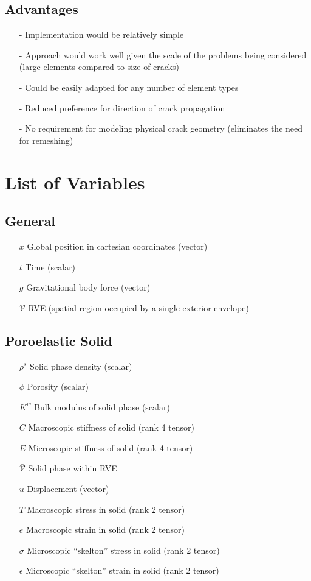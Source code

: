 \documentclass[11pt]{article} %
\begin{document}
\subsection{Advantages}

\begin{itemize}
	\item[-] Implementation would be relatively simple
	\item[-] Approach would work well given the scale of the problems being considered (large elements compared to size of cracks)
	\item[-] Could be easily adapted for any number of element types
	\item[-] Reduced preference for direction of crack propagation
	\item[-] No requirement for modeling physical crack geometry (eliminates the need for remeshing)
\end{itemize}

\section{List of Variables}

\subsection{General}

\begin{itemize}
	\item[$x$] Global position in cartesian coordinates (vector)
	\item[$t$] Time (scalar)
	\item[$g$] Gravitational body force (vector)
	\item[$\mathcal{V}$] RVE (spatial region occupied by a single exterior envelope)
\end{itemize}

\subsection{Poroelastic Solid}

\begin{itemize}
	\item[$\rho^s$] Solid phase density (scalar)
	\item[$\phi$] Porosity (scalar)
	\item[$K^w$] Bulk modulus of solid phase (scalar)
	\item[$C$] Macroscopic stiffness of solid (rank 4 tensor)
	\item[$E$] Microscopic stiffness of solid (rank 4 tensor)
	\item[$\bar{\mathcal{V}}$] Solid phase within RVE
	\item[$u$] Displacement (vector)
	\item[$T$] Macroscopic stress in solid (rank 2 tensor)
	\item[$e$] Macroscopic strain in solid (rank 2 tensor)
	\item[$\sigma$] Microscopic ``skelton'' stress in solid (rank 2 tensor)
	\item[$\epsilon$] Microscopic ``skelton'' strain in solid (rank 2 tensor)
\end{itemize}
\end{document}
